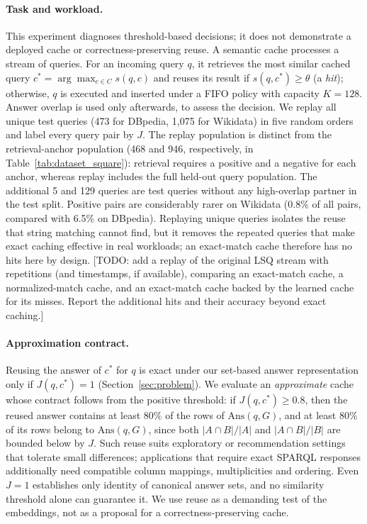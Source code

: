 \documentclass[runningheads]{llncs}
\newcommand{\Ans}{\mathrm{Ans}}
\newcommand{\hp}[1]{{\color{red!75!black}#1}}
\begin{document}
\paragraph{Task and workload.}
This experiment diagnoses threshold-based decisions; it does not demonstrate
a deployed cache or correctness-preserving reuse. A semantic cache processes a stream of queries. For an incoming query $q$, it
retrieves the most similar cached query $c^* = \arg\max_{c \in C} s(q,c)$ and
reuses its result if $s(q,c^*) \geq \theta$ (a \emph{hit}); otherwise, $q$ is
executed and inserted under a FIFO policy with capacity $K = 128$. Answer
overlap is used only afterwards, to assess the decision. We replay all unique
test queries (473 for DBpedia, 1{,}075 for Wikidata) in five random orders and
label every query pair by $J$. The replay population is distinct from the
retrieval-anchor population (468 and 946, respectively, in
Table~\ref{tab:dataset_square}): retrieval requires a positive and a negative
for each anchor, whereas replay includes the full held-out query population.
The additional 5 and 129 queries are test queries without any high-overlap
partner in the test split. Positive pairs are considerably rarer on
Wikidata (0.8\% of all pairs, compared with 6.5\% on DBpedia). Replaying unique
queries isolates the reuse that string matching cannot find, but it removes
the repeated queries that make exact caching effective in real workloads; an
exact-match cache therefore has no hits here by design.
\hp{[TODO: add a replay of the original LSQ stream with repetitions (and
timestamps, if available), comparing an exact-match cache, a normalized-match
cache, and an exact-match cache backed by the learned cache for its misses.
Report the additional hits and their accuracy beyond exact caching.]}

\paragraph{Approximation contract.}
Reusing the answer of $c^*$ for $q$ is exact under our set-based answer
representation only if $J(q,c^*) = 1$ (Section~\ref{sec:problem}). We
evaluate an \emph{approximate} cache whose contract follows from the
positive threshold: if $J(q,c^*) \geq 0.8$, then the reused answer contains at
least $80\%$ of the rows of $\Ans(q,G)$, and at least $80\%$ of its rows belong
to $\Ans(q,G)$, since both $|A \cap B|/|A|$ and $|A \cap B|/|B|$ are bounded
below by $J$. Such reuse suits exploratory or recommendation settings that
tolerate small differences; applications that require exact SPARQL responses additionally need compatible
column mappings, multiplicities and ordering. Even $J = 1$ establishes only
identity of canonical answer sets, and no similarity threshold alone can
guarantee it. We
use reuse as a demanding test of the embeddings, not as a proposal for a
correctness-preserving cache.
\end{document}
